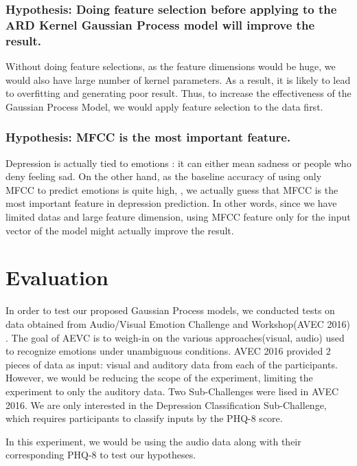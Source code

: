 \documentclass{article}
\begin{document}
	\subsubsection{Hypothesis: Doing feature selection before applying to the ARD Kernel Gaussian Process model will improve the result.}
	Without doing feature selections, as the feature dimensions would be huge, we would also have large number of kernel parameters. 
	As a result, it is likely to lead to overfitting and generating poor result. \cite{Cawley2014} 
	Thus, to increase the effectiveness of the Gaussian Process Model, we would apply feature selection to the data first.

	\subsubsection{Hypothesis: MFCC is the most important feature.}
	Depression is actually tied to emotions : it can either mean sadness or people who deny feeling sad. \cite{Stratou2015} 
	On the other hand, as the baseline accuracy of using only MFCC to predict emotions is quite high, \cite{ElAyadi2011}, 
	we actually guess that MFCC is the most important feature in depression prediction. 
	In other words, since we have limited datas and large feature dimension, 
	using MFCC feature only for the input vector of the model might actually improve the result. \\

	\section{Evaluation}
	In order to test our proposed Gaussian Process models, we conducted tests on data obtained from Audio/Visual Emotion Challenge and Workshop(AVEC 2016) 
	\cite{avec2016}. The goal of AEVC is to weigh-in on the various approaches(visual, audio) used to recognize emotions under unambiguous conditions. 
	AVEC 2016 provided 2 pieces of data as input: visual and auditory data from each of the participants. However, we would be reducing the scope of 
	the experiment, limiting the experiment to only the auditory data. Two Sub-Challenges were lised in AVEC 2016. We are only interested in the Depression Classification Sub-Challenge, which 
	requires participants to classify inputs by the PHQ-8 score.
	
	In this experiment, we would be using the audio data along with their corresponding PHQ-8 to test our hypotheses.
\end{document}
